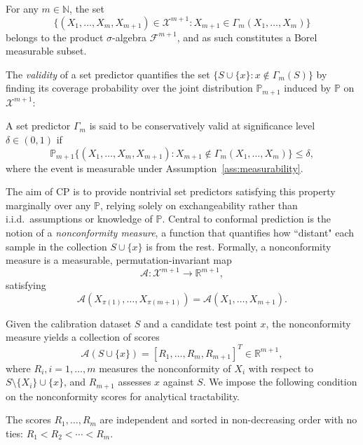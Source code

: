 \begin{assumption}
\label{ass:measurability}
For any $m \in \mathbb{N}$, the set
\[
    \label{eq:violation_set}
    \{(X_1, \ldots, X_m, X_{m+1}) \in \mathcal{X}^{m+1} : X_{m+1} \in \Gamma_m(X_1, \ldots, X_m)\}
\]
belongs to the product $\sigma$-algebra $\mathcal{F}^{m+1}$, and as such constitutes a Borel measurable subset.
\end{assumption}

The \emph{validity} of a set predictor quantifies the set $\big\{ S \cup \{x\} : x \notin \Gamma_m(S) \big\}$ by finding its coverage probability over the joint distribution $\mathbb{P}_{m+1}$ induced by $\mathbb{P}$ on $\mathcal{X}^{m+1}$:
\begin{definition}
\label{def:validity}
A set predictor $\Gamma_m$ is said to be conservatively valid at significance level $\delta \in (0,1)$ if
\begin{equation}
\label{eq:validity}
\mathbb{P}_{m+1} \big\{ (X_1, \ldots, X_m, X_{m+1}) : X_{m+1} \notin \Gamma_m(X_1, \ldots, X_m) \big\} \le \delta,
\end{equation}
where the event is measurable under Assumption~\ref{ass:measurability}.
\end{definition}
The aim of CP is to provide nontrivial set predictors satisfying this property marginally over any $\mathbb{P}$, relying solely on exchangeability rather than i.i.d.\ assumptions or knowledge of $\mathbb{P}$. Central to conformal prediction is the notion of a \emph{nonconformity measure}, a function that quantifies how ``distant" each sample in the collection $S \cup \{x\}$ is from the rest. Formally, a nonconformity measure is a measurable, permutation-invariant map
\[
\mathcal{A} : \mathcal{X}^{m+1} \to \mathbb{R}^{m+1},
\]
satisfying
\[
\mathcal{A}(X_{\pi(1)}, \ldots, X_{\pi(m+1)}) = \mathcal{A}(X_1, \ldots, X_{m+1}).
\]

Given the calibration dataset $S$ and a candidate test point $x$, the nonconformity measure yields a collection of scores
\[
\mathcal{A}(S \cup \{x\}) = [R_1, \ldots, R_m, R_{m+1}]^T \in \mathbb{R}^{m+1},
\]
where $R_i, i=1,\ldots,m$ measures the nonconformity of $X_i$ with respect to $S \setminus \{X_i\} \cup \{x\}$, and $R_{m+1}$ assesses $x$ against $S$. We impose the following condition on the nonconformity scores for analytical tractability.
\begin{assumption}
\label{ass:scores}
The scores $R_1, \ldots, R_m$ are independent and sorted in non-decreasing order with no ties: $R_1 < R_2 < \cdots < R_{m}$.
\end{assumption}

